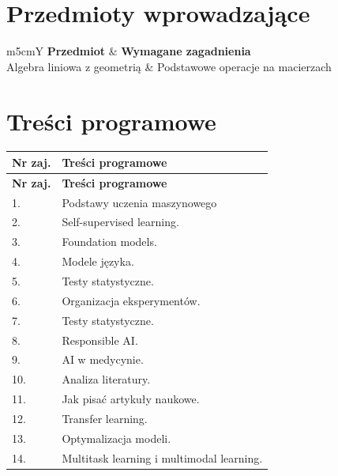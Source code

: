 \documentclass[12pt, a4paper]{article}
\newcommand{\thdrule}{\noalign{\global\setlength{\extrarowheight}{0pt}}}
\newcommand{\thdend}{\noalign{\global\setlength{\extrarowheight}{3pt}}}
\begin{document}
\section{Przedmioty wprowadzające}

{\scriptsize
\begin{tabularx}{\textwidth}{m{5cm}Y}
\thdrule\toprule
{} {\color{white}\textbf{Przedmiot}} & {\color{white}\textbf{Wymagane zagadnienia}} \\
\midrule\thdend
   Algebra liniowa z geometrią & Podstawowe operacje na macierzach \\
\bottomrule
\end{tabularx}}

\section{Treści programowe}

{\scriptsize
\begin{longtable}{m{1.5cm}m{14.5cm}}
\thdrule\toprule
\rowcolor{pjatkRed} {\color{white}\textbf{Nr zaj.}} & {\color{white}\textbf{Treści programowe}} \\
\midrule\thdend
\endfirsthead
\thdrule\toprule
\rowcolor{pjatkRed} {\color{white}\textbf{Nr zaj.}} & {\color{white}\textbf{Treści programowe}} \\
\midrule\thdend
\endhead
  \rowcolor{tableRowLight} 1. & Podstawy uczenia maszynowego \\
  \rowcolor{tableRowAlt} 2. & Self-supervised learning. \\
  \rowcolor{tableRowLight} 3. & Foundation models. \\
  \rowcolor{tableRowAlt} 4. & Modele języka. \\
  \rowcolor{tableRowLight} 5. & Testy statystyczne. \\
  \rowcolor{tableRowAlt} 6. & Organizacja eksperymentów. \\
  \rowcolor{tableRowLight} 7. & Testy statystyczne. \\
  \rowcolor{tableRowAlt} 8. & Responsible AI. \\
  \rowcolor{tableRowLight} 9. & AI w medycynie. \\
  \rowcolor{tableRowAlt} 10. & Analiza literatury. \\
  \rowcolor{tableRowLight} 11. & Jak pisać artykuły naukowe. \\
  \rowcolor{tableRowAlt} 12. & Transfer learning. \\
  \rowcolor{tableRowLight} 13. & Optymalizacja modeli. \\
  \rowcolor{tableRowAlt} 14. & Multitask learning i multimodal learning. \\
\bottomrule
\end{longtable}}
\end{document}
